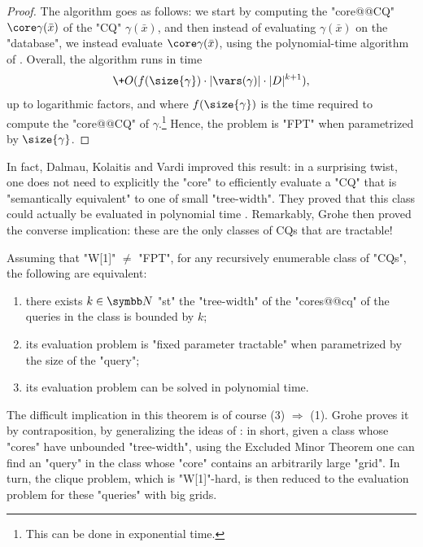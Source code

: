 \begin{proof}
	The algorithm goes as follows:
	we start by computing the "core@@CQ" $\core\gamma(\bar x)$
	of the "CQ" $\gamma(\bar x)$, and then instead of evaluating
	$\gamma(\bar x)$ on the "database", we instead evaluate
	$\core\gamma(\bar x)$, using the polynomial-time algorithm
	of .
	Overall, the algorithm runs in time
	\[
		\+O(f(\size{\gamma})\cdot|\vars(\gamma)|\cdot |D|^{k+1}),
	\]
	up to logarithmic factors, and where $f(\size{\gamma})$
	is the time required to compute the "core@@CQ" of
	$\gamma$.\footnote{This can be done in exponential time.}
	Hence, the problem is "FPT" when parametrized by $\size{\gamma}$.
\end{proof}

In fact, Dalmau, Kolaitis and Vardi improved this result: in a surprising twist, 
one does not need to explicitly the "core" to efficiently evaluate
a "CQ" that is "semantically equivalent" to one of small "tree-width".
They proved that this class could actually be evaluated in polynomial time
\cite[Corollary~5]{DalmauKolaitisVardi2002Constraint}.
Remarkably, Grohe then proved the converse implication: these 
are the only classes of CQs that are tractable!
\begin{proposition}
	Assuming that "W[1]" $\neq$ "FPT", for any recursively enumerable
	class of "CQs", the following are equivalent:
	\begin{enumerate}
		\item there exists $k\in\N$ "st" the "tree-width" of the "cores@@cq"
			of the queries in the class is bounded by $k$;
		\item its evaluation problem is "fixed parameter tractable"
			when parametrized by the size of the "query";
		\item its evaluation problem can be solved in polynomial time.
	\end{enumerate}
\end{proposition}
The difficult implication in this theorem is of course (3) $\Rightarrow$ (1).
Grohe proves it by contraposition, by generalizing
the ideas of \cite{GroheSchwentickSegoufin2001Evaluation}:
in short, given a class whose "cores" have unbounded "tree-width",
using the Excluded Minor Theorem \cite[$\ast$ (1.5)]{RobertsonSeymour1986GraphMinors5}
one can find an "query" in the class whose "core" 
contains an arbitrarily large "grid". In turn, the clique problem,
which is "W[1]"-hard, is then reduced to the evaluation problem
for these "queries" with big grids.

